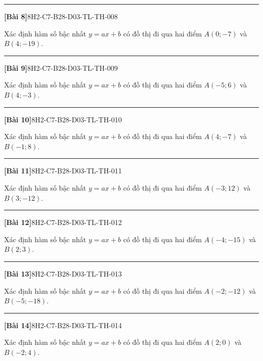 \documentclass[12pt,a4paper]{article}
\newif\ifloigiai
\newenvironment{cauhoi}[2]{%
  \par\medskip\noindent\rule{\textwidth}{0.4pt}\par\nopagebreak
  \noindent\textbf{[#1]}\hfill{\scriptsize\ttfamily #2}\par\nopagebreak\smallskip}{\par}
\newcommand{\loigiai}[1]{\ifloigiai\par\smallskip\noindent\textit{Lời giải.} #1\par\fi}
\begin{document}
\begin{cauhoi}{Bài 8}{8H2-C7-B28-D03-TL-TH-008}
Xác định hàm số bậc nhất $y=ax+b$ có đồ thị đi qua hai điểm $A(0;-7)$ và $B(4;-19)$.
\loigiai{Thay toạ độ $A$, $B$ vào $y=ax+b$ ta có hệ $-7=0a+b$ và $-19=4a+b$. Trừ hai vế: $a=\dfrac{-7+19}{0-4}=-3$. Suy ra $b=-7+3\cdot(0)=-7$. Vậy $y=-3x-7$.}
\end{cauhoi}
\begin{cauhoi}{Bài 9}{8H2-C7-B28-D03-TL-TH-009}
Xác định hàm số bậc nhất $y=ax+b$ có đồ thị đi qua hai điểm $A(-5;6)$ và $B(4;-3)$.
\loigiai{Thay toạ độ $A$, $B$ vào $y=ax+b$ ta có hệ $6=-5a+b$ và $-3=4a+b$. Trừ hai vế: $a=\dfrac{6+3}{-5-4}=-1$. Suy ra $b=6+1\cdot(-5)=1$. Vậy $y=-x+1$.}
\end{cauhoi}
\begin{cauhoi}{Bài 10}{8H2-C7-B28-D03-TL-TH-010}
Xác định hàm số bậc nhất $y=ax+b$ có đồ thị đi qua hai điểm $A(4;-7)$ và $B(-1;8)$.
\loigiai{Thay toạ độ $A$, $B$ vào $y=ax+b$ ta có hệ $-7=4a+b$ và $8=-a+b$. Trừ hai vế: $a=\dfrac{-7-8}{4+1}=-3$. Suy ra $b=-7+3\cdot(4)=5$. Vậy $y=-3x+5$.}
\end{cauhoi}
\begin{cauhoi}{Bài 11}{8H2-C7-B28-D03-TL-TH-011}
Xác định hàm số bậc nhất $y=ax+b$ có đồ thị đi qua hai điểm $A(-3;12)$ và $B(3;-12)$.
\loigiai{Thay toạ độ $A$, $B$ vào $y=ax+b$ ta có hệ $12=-3a+b$ và $-12=3a+b$. Trừ hai vế: $a=\dfrac{12+12}{-3-3}=-4$. Suy ra $b=12+4\cdot(-3)=0$. Vậy $y=-4x$.}
\end{cauhoi}
\begin{cauhoi}{Bài 12}{8H2-C7-B28-D03-TL-TH-012}
Xác định hàm số bậc nhất $y=ax+b$ có đồ thị đi qua hai điểm $A(-4;-15)$ và $B(2;3)$.
\loigiai{Thay toạ độ $A$, $B$ vào $y=ax+b$ ta có hệ $-15=-4a+b$ và $3=2a+b$. Trừ hai vế: $a=\dfrac{-15-3}{-4-2}=3$. Suy ra $b=-15-3\cdot(-4)=-3$. Vậy $y=3x-3$.}
\end{cauhoi}
\begin{cauhoi}{Bài 13}{8H2-C7-B28-D03-TL-TH-013}
Xác định hàm số bậc nhất $y=ax+b$ có đồ thị đi qua hai điểm $A(-2;-12)$ và $B(-5;-18)$.
\loigiai{Thay toạ độ $A$, $B$ vào $y=ax+b$ ta có hệ $-12=-2a+b$ và $-18=-5a+b$. Trừ hai vế: $a=\dfrac{-12+18}{-2+5}=2$. Suy ra $b=-12-2\cdot(-2)=-8$. Vậy $y=2x-8$.}
\end{cauhoi}
\begin{cauhoi}{Bài 14}{8H2-C7-B28-D03-TL-TH-014}
Xác định hàm số bậc nhất $y=ax+b$ có đồ thị đi qua hai điểm $A(2;0)$ và $B(-2;4)$.
\loigiai{Thay toạ độ $A$, $B$ vào $y=ax+b$ ta có hệ $0=2a+b$ và $4=-2a+b$. Trừ hai vế: $a=\dfrac{0-4}{2+2}=-1$. Suy ra $b=0+1\cdot(2)=2$. Vậy $y=-x+2$.}
\end{cauhoi}
\end{document}
